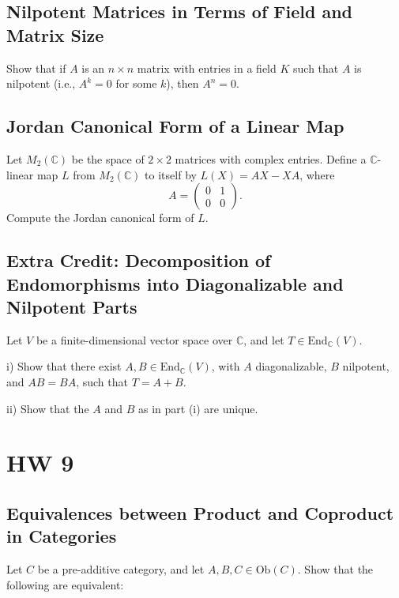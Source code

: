 \documentclass[lang=cn,11pt]{template}
\begin{document}
\section{Nilpotent Matrices in Terms of Field and Matrix Size}
Show that if \( A \) is an \( n \times n \) matrix with entries in a field \( K \) such that \( A \) is nilpotent (i.e., \( A^k = 0 \) for some \( k \)), then \( A^n = 0 \).

\section{Jordan Canonical Form of a Linear Map}
Let \( M_2(\mathbb{C}) \) be the space of \( 2 \times 2 \) matrices with complex entries. Define a \( \mathbb{C} \)-linear map \( L \) from \( M_2(\mathbb{C}) \) to itself by \( L(X) = AX - XA \), where
\[
A = \begin{pmatrix} 0 & 1 \\ 0 & 0 \end{pmatrix}.
\]
Compute the Jordan canonical form of \( L \).

\section{Extra Credit: Decomposition of Endomorphisms into Diagonalizable and Nilpotent Parts}
Let \( V \) be a finite-dimensional vector space over \( \mathbb{C} \), and let \( T \in \text{End}_{\mathbb{C}}(V) \).

i) Show that there exist \( A, B \in \text{End}_{\mathbb{C}}(V) \), with \( A \) diagonalizable, \( B \) nilpotent, and \( AB = BA \), such that \( T = A + B \).

ii) Show that the \( A \) and \( B \) as in part (i) are unique.









\chapter{HW 9}

\section{Equivalences between Product and Coproduct in Categories}
Let \( C \) be a pre-additive category, and let \( A, B, C \in \text{Ob}(C) \). Show that the following are equivalent:
\end{document}
